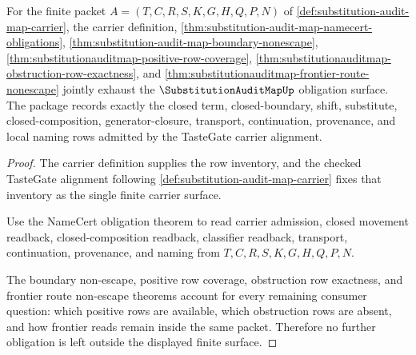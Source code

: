 \begin{theorem}
\label{thm:substitution-audit-map-obligation-closure-package}
For the finite packet $A=(T,C,R,S,K,G,H,Q,P,N)$ of \autoref{def:substitution-audit-map-carrier}, the carrier definition, \autoref{thm:substitution-audit-map-namecert-obligations}, \autoref{thm:substitution-audit-map-boundary-nonescape}, \autoref{thm:substitutionauditmap-positive-row-coverage}, \autoref{thm:substitutionauditmap-obstruction-row-exactness}, and \autoref{thm:substitutionauditmap-frontier-route-nonescape} jointly exhaust the $\SubstitutionAuditMapUp$ obligation surface. The package records exactly the closed term, closed-boundary, shift, substitute, closed-composition, generator-closure, transport, continuation, provenance, and local naming rows admitted by the TasteGate carrier alignment.
\end{theorem}
\begin{proof}
The carrier definition supplies the row inventory, and the checked TasteGate alignment following \autoref{def:substitution-audit-map-carrier} fixes that inventory as the single finite carrier surface.

Use the NameCert obligation theorem to read carrier admission, closed movement readback, closed-composition readback, classifier readback, transport, continuation, provenance, and naming from $T,C,R,S,K,G,H,Q,P,N$.

The boundary non-escape, positive row coverage, obstruction row exactness, and frontier route non-escape theorems account for every remaining consumer question: which positive rows are available, which obstruction rows are absent, and how frontier reads remain inside the same packet. Therefore no further obligation is left outside the displayed finite surface.
\end{proof}

